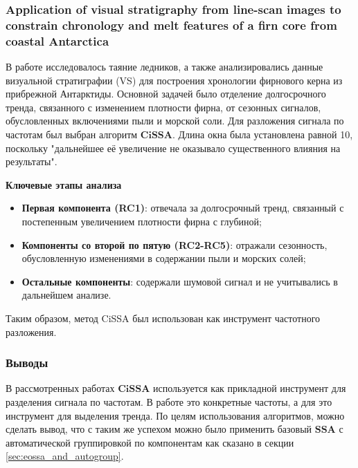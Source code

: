 \documentclass[a4paper, 11pt]{article}
\newcommand{\SSA}{\textbf{SSA}}
\newcommand{\CISSA}{\textbf{CiSSA}}
\begin{document}
\subsubsection{Application of visual stratigraphy from line-scan images to constrain chronology and melt features of a firn core from coastal Antarctica}

В работе \cite{Dey_Thamban_Laluraj_Mahalinganathan_Redkar_Kumar_Matsuoka_2023} исследовалось таяние ледников, а также анализировались данные визуальной стратиграфии (VS) для построения хронологии фирнового керна из прибрежной Антарктиды. Основной задачей было отделение долгосрочного тренда, связанного с изменением плотности фирна, от сезонных сигналов, обусловленных включениями пыли и морской соли. 
Для разложения сигнала по частотам был выбран алгоритм $\CISSA$. Длина окна была установлена равной 10, поскольку "дальнейшее её увеличение не оказывало существенного влияния на результаты".

\noindent \textbf{Ключевые этапы анализа}

\begin{itemize}
    \item \textbf{Первая компонента (RC1)}: отвечала за долгосрочный тренд, связанный с постепенным увеличением плотности фирна с глубиной;
	\item \textbf{Компоненты со второй по пятую (RC2-RC5)}: отражали сезонность, обусловленную изменениями в содержании пыли и морских солей;
	\item \textbf{Остальные компоненты}: содержали шумовой сигнал и не учитывались в дальнейшем анализе.
\end{itemize}

Таким образом, метод CiSSA был использован как инструмент частотного разложения.

\subsubsection{Выводы}

В рассмотренных работах $\CISSA$ используется как прикладной инструмент для разделения сигнала по частотам. В работе \cite{cognitive} это конкретные частоты, а для \cite{Dey_Thamban_Laluraj_Mahalinganathan_Redkar_Kumar_Matsuoka_2023} это инструмент для выделения тренда. По целям использования алгоритмов, можно сделать вывод, что с таким же успехом можно было применить базовый $\SSA$ с автоматической группировкой по компонентам как сказано в секции \ref{sec:eossa_and_autogroup}.


\newpage
\end{document}

